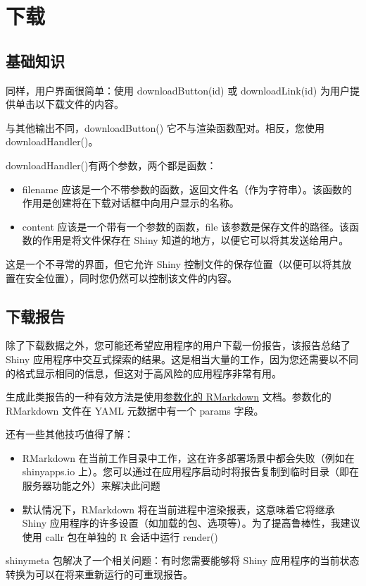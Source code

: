 \section{下载}
\subsection{基础知识}
同样，用户界面很简单：使用 downloadButton(id) 或 downloadLink(id) 为用户提供单击以下载文件的内容。

与其他输出不同，downloadButton() 它不与渲染函数配对。相反，您使用 downloadHandler()。

downloadHandler()有两个参数，两个都是函数：

\begin{itemize}
    \item filename 应该是一个不带参数的函数，返回文件名（作为字符串）。该函数的作用是创建将在下载对话框中向用户显示的名称。
    \item content 应该是一个带有一个参数的函数，file 该参数是保存文件的路径。该函数的作用是将文件保存在 Shiny 知道的地方，以便它可以将其发送给用户。
\end{itemize}

这是一个不寻常的界面，但它允许 Shiny 控制文件的保存位置（以便可以将其放置在安全位置），同时您仍然可以控制该文件的内容。
\subsection{下载报告}
除了下载数据之外，您可能还希望应用程序的用户下载一份报告，该报告总结了 Shiny 应用程序中交互式探索的结果。这是相当大量的工作，因为您还需要以不同的格式显示相同的信息，但这对于高风险的应用程序非常有用。

生成此类报告的一种有效方法是使用\href{https://bookdown.org/yihui/rmarkdown/parameterized-reports.html}{参数化的 RMarkdown} 文档。参数化的 RMarkdown 文件在 YAML 元数据中有一个 params 字段。

还有一些其他技巧值得了解：
\begin{itemize}
    \item RMarkdown 在当前工作目录中工作，这在许多部署场景中都会失败（例如在 shinyapps.io 上）。您可以通过在应用程序启动时将报告复制到临时目录（即在服务器功能之外）来解决此问题
    \item 默认情况下，RMarkdown 将在当前进程中渲染报表，这意味着它将继承 Shiny 应用程序的许多设置（如加载的包、选项等）。为了提高鲁棒性，我建议使用 callr 包在单独的 R 会话中运行 render()
\end{itemize}

shinymeta 包解决了一个相关问题：有时您需要能够将 Shiny 应用程序的当前状态转换为可以在将来重新运行的可重现报告。